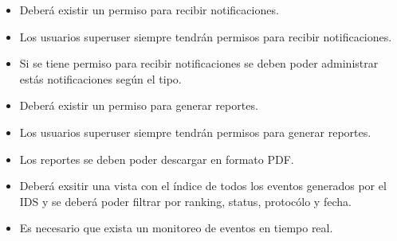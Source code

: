 \begin{itemize}
    \item Deberá existir un permiso para recibir notificaciones.
    \item Los usuarios superuser siempre tendrán permisos para recibir notificaciones.
    \item Si se tiene permiso para recibir notificaciones se deben poder administrar estás notificaciones según el tipo.
    \item Deberá existir un permiso para generar reportes.
    \item Los usuarios superuser siempre tendrán permisos para generar reportes.
    \item Los reportes se deben poder descargar en formato PDF.
    \item Deberá exsitir una vista con el índice de todos los eventos generados por el IDS y se deberá poder filtrar por ranking, status, protocólo y fecha.
    \item Es necesario que exista un monitoreo de eventos en tiempo real.
\end{itemize}


%
